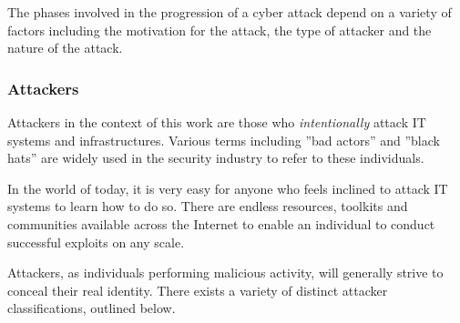 The phases involved in the progression of a cyber attack depend on a variety of factors including the motivation for the attack, the type of attacker and the nature of the attack.


\subsubsection{Attackers} \label{AboutAttackers}
 Attackers in the context of this work are those who \textit{intentionally} attack IT systems and infrastructures. Various terms including ''bad actors'' and ''black hats'' are widely used in the security industry to refer to these individuals. 
 
 In the world of today, it is very easy for anyone who feels inclined to attack IT systems to learn how to do so. There are endless resources, toolkits and communities available across the Internet to enable an individual to conduct successful exploits on any scale.

Attackers, as individuals performing malicious activity, will generally strive to conceal their real identity. There exists a variety of distinct attacker classifications, outlined below.

